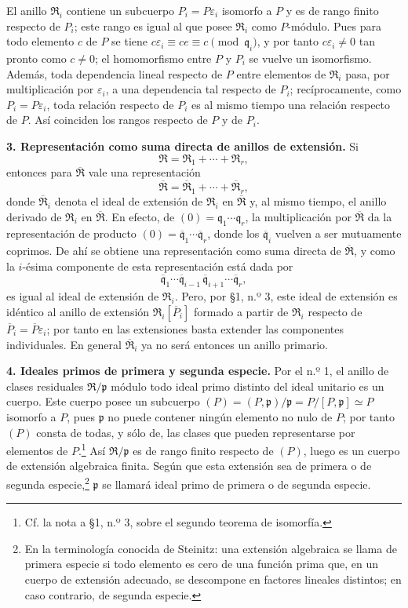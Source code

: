 \documentclass[11pt]{article}
\begin{document}
El anillo $\mathfrak R_i$ contiene un subcuerpo $P_i=P\varepsilon_i$ isomorfo a $P$ y es de rango finito respecto de $P_i$; este rango es igual al que posee $\mathfrak R_i$ como $P$-módulo. Pues para todo elemento $c$ de $P$ se tiene $c\varepsilon_i\equiv ce\equiv c\pmod{\mathfrak q_i}$, y por tanto $c\varepsilon_i\ne0$ tan pronto como $c\ne0$; el homomorfismo entre $P$ y $P_i$ se vuelve un isomorfismo. Además, toda dependencia lineal respecto de $P$ entre elementos de $\mathfrak R_i$ pasa, por multiplicación por $\varepsilon_i$, a una dependencia tal respecto de $P_i$; recíprocamente, como $P_i=P\varepsilon_i$, toda relación respecto de $P_i$ es al mismo tiempo una relación respecto de $P$. Así coinciden los rangos respecto de $P$ y de $P_i$.

\textbf{3. Representación como suma directa de anillos de extensión.} Si
\[
   \mathfrak R=\mathfrak R_1+\cdots+\mathfrak R_r,
\]
entonces para $\overline{\mathfrak R}$ vale una representación
\[
   \overline{\mathfrak R}=\overline{\mathfrak R}_1+\cdots+\overline{\mathfrak R}_r,
\]
donde $\overline{\mathfrak R}_i$ denota el ideal de extensión de $\mathfrak R_i$ en $\overline{\mathfrak R}$ y, al mismo tiempo, el anillo derivado de $\mathfrak R_i$ en $\overline{\mathfrak R}$. En efecto, de $(0)=\mathfrak q_1\cdots\mathfrak q_r$, la multiplicación por $\overline{\mathfrak R}$ da la representación de producto $(0)=\overline{\mathfrak q}_1\cdots\overline{\mathfrak q}_r$, donde los $\overline{\mathfrak q}_i$ vuelven a ser mutuamente coprimos. De ahí se obtiene una representación como suma directa de $\overline{\mathfrak R}$, y como la $i$-ésima componente de esta representación está dada por
\[
   \overline{\mathfrak q}_1\cdots \overline{\mathfrak q}_{i-1}\,
   \overline{\mathfrak q}_{i+1}\cdots \overline{\mathfrak q}_r,
\]
es igual al ideal de extensión de $\mathfrak R_i$. Pero, por \S 1, n.º 3, este ideal de extensión es idéntico al anillo de extensión $\mathfrak R_i[\overline P_i]$ formado a partir de $\mathfrak R_i$ respecto de $\overline P_i=\overline P\varepsilon_i$; por tanto en las extensiones basta extender las componentes individuales. En general $\overline{\mathfrak R}_i$ ya no será entonces un anillo primario.

\textbf{4. Ideales primos de primera y segunda especie.} Por el n.º 1, el anillo de clases residuales $\mathfrak R/\mathfrak p$ módulo todo ideal primo distinto del ideal unitario es un cuerpo. Este cuerpo posee un subcuerpo $(P)=(P,\mathfrak p)/\mathfrak p=P/[P,\mathfrak p]\simeq P$ isomorfo a $P$, pues $\mathfrak p$ no puede contener ningún elemento no nulo de $P$; por tanto $(P)$ consta de todas, y sólo de, las clases que pueden representarse por elementos de $P$.\footnote{Cf. la nota a \S 1, n.º 3, sobre el segundo teorema de isomorfía.} Así $\mathfrak R/\mathfrak p$ es de rango finito respecto de $(P)$, luego es un cuerpo de extensión algebraica finita. Según que esta extensión sea de primera o de segunda especie,\footnote{En la terminología conocida de Steinitz: una extensión algebraica se llama de primera especie si todo elemento es cero de una función prima que, en un cuerpo de extensión adecuado, se descompone en factores lineales distintos; en caso contrario, de segunda especie.} $\mathfrak p$ se llamará ideal primo de primera o de segunda especie.
\end{document}
